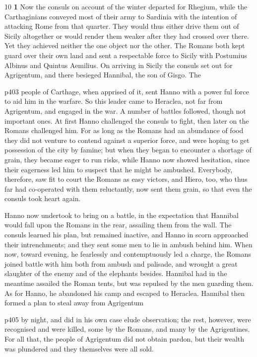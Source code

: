 10
\textbf{1} Now the consuls on account of the winter departed for Rhegium, while the Carthaginians conveyed most of their army to Sardinia with the intention of attacking Rome from that quarter. They would thus either drive them out of Sicily altogether or would render them weaker after they had crossed over there. Yet they achieved neither the one object nor the other. The Romans both kept guard over their own land and sent a respectable force to Sicily with Postumius Albinus and Quintus Aemilius. On arriving in Sicily the consuls set out for Agrigentum, and there besieged Hannibal, the son of Gisgo. The

p403 people of Carthage, when apprised of it, sent Hanno with a power ­ful force to aid him in the warfare. So this leader came to Heraclea, not far from Agrigentum, and engaged in the war. A number of battles followed, though not important ones. At first Hanno challenged the consuls to fight, then later on the Romans challenged him. For as long as the Romans had an abundance of food they did not venture to contend against a superior force, and were hoping to get possession of the city by famine; but when they began to encounter a shortage of grain, they became eager to run risks, while Hanno now showed hesitation, since their eagerness led him to suspect that he might be ambushed. Everybody, therefore, saw fit to court the Romans as easy victors, and Hiero, too, who thus far had co-operated with them reluctantly, now sent them grain, so that even the consuls took heart again.

Hanno now undertook to bring on a battle, in the expectation that Hannibal would fall upon the Romans in the rear, assailing them from the wall. The consuls learned his plan, but remained inactive, and Hanno in scorn approached their intrenchments; and they sent some men to lie in ambush behind him. When now, toward evening, he fearlessly and contemptuously led a charge, the Romans joined battle with him both from ambush and palisade, and wrought a great slaughter of the enemy and of the elephants besides. Hannibal had in the meantime assailed the Roman tents, but was repulsed by the men guarding them. As for Hanno, he abandoned his camp and escaped to Heraclea. Hannibal then formed a plan to steal away from Agrigentum

p405 by night, and did in his own case elude observation; the rest, however, were recognised and were killed, some by the Romans, and many by the Agrigentines. For all that, the people of Agrigentum did not obtain pardon, but their wealth was plundered and they themselves were all sold.

